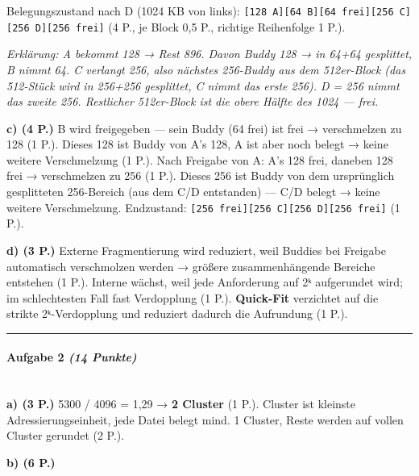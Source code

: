 \documentclass[11pt, a4paper]{article}
\begin{document}
Belegungszustand nach D (1024 KB von links): \texttt{[128 A][64 B][64 frei][256 C][256 D][256 frei]} (4 P., je Block 0,5 P., richtige Reihenfolge 1 P.).

\textit{Erklärung: A bekommt 128 → Rest 896. Davon Buddy 128 → in 64+64 gesplittet, B nimmt 64. C verlangt 256, also nächstes 256-Buddy aus dem 512er-Block (das 512-Stück wird in 256+256 gesplittet, C nimmt das erste 256). D = 256 nimmt das zweite 256. Restlicher 512er-Block ist die obere Hälfte des 1024 — frei.}


\textbf{c) (4 P.)} B wird freigegeben — sein Buddy (64 frei) ist frei → verschmelzen zu 128 (1 P.). Dieses 128 ist Buddy von A's 128, A ist aber noch belegt → keine weitere Verschmelzung (1 P.). Nach Freigabe von A: A's 128 frei, daneben 128 frei → verschmelzen zu 256 (1 P.). Dieses 256 ist Buddy von dem ursprünglich gesplitteten 256-Bereich (aus dem C/D entstanden) — C/D belegt → keine weitere Verschmelzung. Endzustand: \texttt{[256 frei][256 C][256 D][256 frei]} (1 P.).


\textbf{d) (3 P.)} Externe Fragmentierung wird reduziert, weil Buddies bei Freigabe automatisch verschmolzen werden → größere zusammenhängende Bereiche entstehen (1 P.). Interne wächst, weil jede Anforderung auf 2ᵏ aufgerundet wird; im schlechtesten Fall fast Verdopplung (1 P.). \textbf{Quick-Fit} verzichtet auf die strikte 2ᵏ-Verdopplung und reduziert dadurch die Aufrundung (1 P.).



\noindent\textcolor{rulegray}{\rule{\linewidth}{0.4pt}}


\paragraph{Aufgabe 2 \textit{(14 Punkte)}}\mbox{}\\[2pt]

\textbf{a) (3 P.)} 5300 / 4096 = 1,29 → \textbf{2 Cluster} (1 P.). Cluster ist kleinste Adressierungseinheit, jede Datei belegt mind. 1 Cluster, Reste werden auf vollen Cluster gerundet (2 P.).


\textbf{b) (6 P.)}
\end{document}
